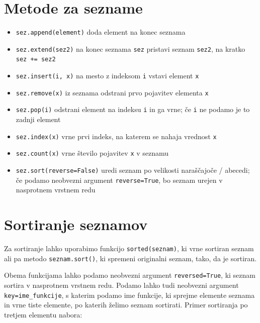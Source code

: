 \documentclass[
]{report}
\providecommand{\tightlist}{%
  \setlength{\itemsep}{0pt}\setlength{\parskip}{0pt}}
\begin{document}
\hypertarget{metode-za-sezname}{%
\section{Metode za sezname}\label{metode-za-sezname}}

\begin{itemize}
\tightlist
\item
  \texttt{sez.append(element)} doda element na konec seznama
\item
  \texttt{sez.extend(sez2)} na konec seznama \texttt{sez} pristavi seznam \texttt{sez2}, na kratko \texttt{sez\ +=\ sez2}
\item
  \texttt{sez.insert(i,\ x)} na mesto z indeksom \texttt{i} vstavi element \texttt{x}
\item
  \texttt{sez.remove(x)} iz seznama odstrani prvo pojavitev elementa \texttt{x}
\item
  \texttt{sez.pop(i)} odstrani element na indeksu \texttt{i} in ga vrne; če \texttt{i} ne podamo je to zadnji element
\item
  \texttt{sez.index(x)} vrne prvi indeks, na katerem se nahaja vrednost \texttt{x}
\item
  \texttt{sez.count(x)} vrne število pojavitev \texttt{x} v seznamu
\item
  \texttt{sez.sort(reverse=False)} uredi seznam po velikosti naraščajoče / abecedi; če podamo neobvezni argument \texttt{reverse=True}, bo seznam urejen v nasprotnem vrstnem redu
\end{itemize}

\hypertarget{sortiranje-seznamov}{%
\section{Sortiranje seznamov}\label{sortiranje-seznamov}}

Za sortiranje lahko uporabimo funkcijo \texttt{sorted(seznam)}, ki vrne sortiran seznam ali pa metodo \texttt{seznam.sort()}, ki spremeni originalni seznam, tako, da je sortiran.

Obema funkcijama lahko podamo neobvezni argument \texttt{reversed=True}, ki seznam sortira v nasprotnem vrstnem redu. Podamo lahko tudi neobvezni argument \texttt{key=ime\_funkcije}, s katerim podamo ime funkcije, ki sprejme elemente seznama in vrne tiste elemente, po katerih želimo seznam sortirati. Primer sortiranja po tretjem elementu nabora:
\end{document}
